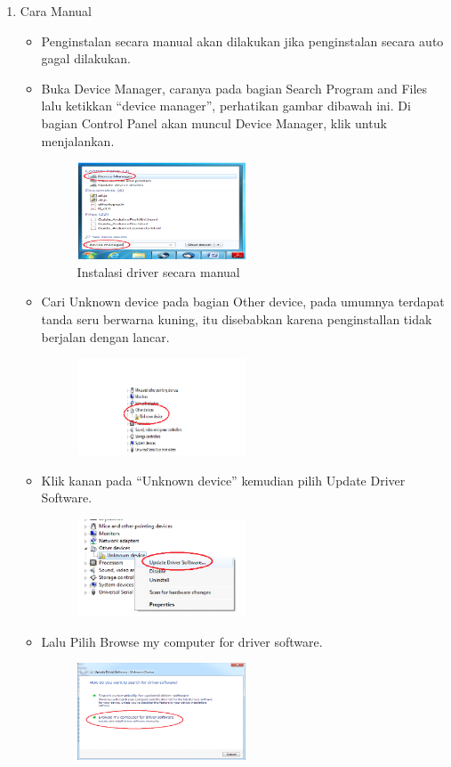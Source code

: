 \begin{enumerate}
\item Cara Manual
\begin{itemize}
\item Penginstalan secara manual akan dilakukan jika penginstalan secara auto gagal dilakukan.
\item Buka Device Manager, caranya pada bagian Search Program and Files lalu ketikkan “device manager”, perhatikan gambar dibawah ini. Di bagian Control Panel akan muncul Device Manager, klik untuk menjalankan.
\begin{figure}[H] 
\includegraphics[width=5cm]{figures/5/Teori/1174025/no4.png}
\centering
\caption{Instalasi driver secara manual}
\end{figure}

\item Cari Unknown device pada bagian Other device, pada umumnya terdapat tanda seru berwarna kuning, itu disebabkan karena penginstallan tidak berjalan dengan lancar.
\begin{figure}[H] 
\includegraphics[width=5cm]{figures/5/Teori/1174025/no5.png}
\centering
\end{figure}

\item Klik kanan pada “Unknown device” kemudian pilih Update Driver Software.
\begin{figure}[H] 
\includegraphics[width=5cm]{figures/5/Teori/1174025/no6.png}
\centering
\end{figure}

\item Lalu Pilih Browse my computer for driver software.
\begin{figure}[H] 
\includegraphics[width=5cm]{figures/5/Teori/1174025/no7.png}
\centering
\end{figure}


\end{itemize}
\end{enumerate}
